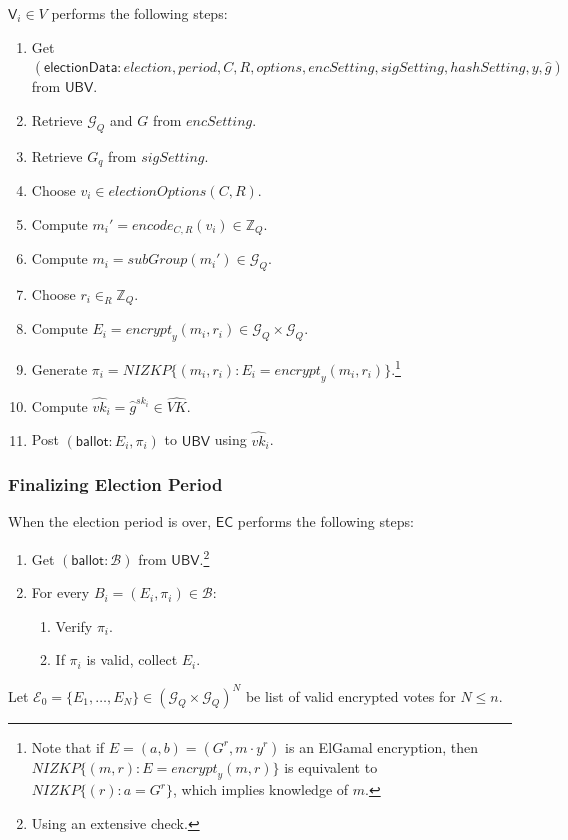\documentclass[bibtotoc,halfparskip,oneside]{scrreprt}
\newcommand{\descrElection}{\mathit{election}\xspace}
\newcommand{\descrOptions}{\mathit{options}\xspace}
\newcommand{\period}{\mathit{period}\xspace}
\newcommand{\sk}[1]{\mathit{sk}_{#1}\xspace}
\newcommand{\vkhat}[1]{\hat{\mathit{vk}}_{#1}\xspace}
\newcommand{\EC}{\ensuremath{\mathsf{EC}}\xspace}
\newcommand{\UBV}{\ensuremath{\mathsf{UBV}}\xspace}
\newcommand{\Voter}[1]{\ensuremath{\mathsf{V}_{#1}}\xspace}
\begin{document}
	$\Voter{i}\in V$ performs the following steps:
	\begin{enumerate}
		\item Get $(\mathsf{electionData}:\descrElection, \period, C, R, \descrOptions, \mathit{encSetting},\mathit{sigSetting},\mathit{hashSetting},y, \hat{g})$ from \UBV.
		\item Retrieve $\mathcal{G}_Q$ and $G$ from $\mathit{encSetting}$.
		\item Retrieve $G_q$ from $\mathit{sigSetting}$.
		\item Choose $v_i\in\mathit{electionOptions}(C,R)$.
		\item Compute $m_i'=\mathit{encode}_{C,R}(v_i) \in \mathbb{Z}_Q$.
		\item Compute $m_i=\mathit{subGroup}(m_i') \in \mathcal{G}_Q$.
		\item Choose $r_i\in_R\mathbb{Z}_Q$.
		\item Compute $E_i=\mathit{encrypt}_y(m_i,r_i)\in\mathcal{G}_Q\times\mathcal{G}_Q$.
		\item Generate $\pi_{i}=\mathit{NIZKP}\{(m_i,r_i):E_i=\mathit{encrypt}_y(m_i,r_i)\}$.\footnote{Note that if $E=(a,b)=(G^{r},m\cdot y^{r})$ is an ElGamal encryption, then $\mathit{NIZKP}\{(m,r):E=\mathit{encrypt}_y(m,r)\}$ is equivalent to $\mathit{NIZKP}\{(r):a=G^{r}\}$, which implies knowledge of $m$.}
		\item Compute $\vkhat{i}=\hat{g}^{\sk{i}}\in\hat{\mathit{VK}}$.
		\item Post $(\mathsf{ballot}:E_i,\pi_{i})$ to \UBV using $\vkhat{i}$.
	\end{enumerate}
	
	\subsubsection{Finalizing Election Period}
	
	When the election period is over, \EC performs the following steps:
	\begin{enumerate}
		\item Get $(\mathsf{ballot}:\mathcal{B})$ from \UBV.\footnote{Using an extensive check.}
		\item For every $B_i=(E_i,\pi_{i})\in\mathcal{B}$:
		\begin{enumerate}
			\item Verify $\pi_{i}$.
			\item If $\pi_{i}$ is valid, collect $E_{i}$.
		\end{enumerate}
	\end{enumerate}
	Let $\mathcal{E}_0=\{E_1,\ldots,E_N\}\in(\mathcal{G}_Q\times\mathcal{G}_Q)^N$ be list of valid encrypted votes for $N\leq n$.
	
\end{document}
